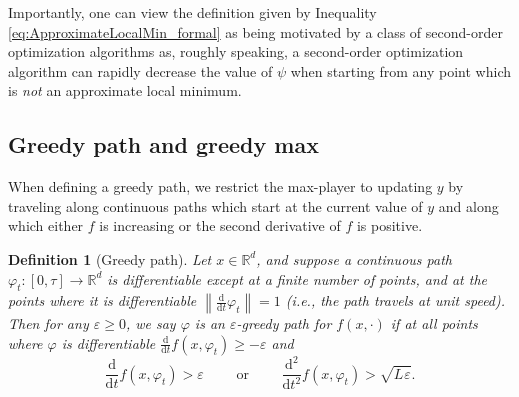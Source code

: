 \documentclass[11pt,letterpaper]{article}
\renewcommand{\epsilon}{\varepsilon}
\newtheorem{definition}[theorem]{Definition}
\begin{document}
Importantly, one can view the definition given by Inequality \eqref{eq:ApproximateLocalMin_formal} as being motivated by a class of second-order optimization algorithms as,
 roughly speaking, a second-order optimization algorithm can rapidly decrease the value of $\psi$ when starting from any point which is {\em not} an approximate local minimum. 





\subsection{Greedy path and greedy max}

%
When defining a greedy path, we restrict the max-player to updating $y$ by traveling along continuous paths which start at the current value of $y$ and along which either $f$ is increasing or the second derivative of $f$ is positive.  %

\begin{definition}[{Greedy path}] \label{def_greedy_path}
Let $x\in \mathbb{R}^d$, and suppose a continuous path $\varphi_t:[0,\tau] \rightarrow \mathbb{R}^d$ is differentiable except at a finite number of points, and at the points where it is differentiable $\left\|\frac{\mathrm{d}}{\mathrm{d} t} \varphi_t \right\| = 1$ (i.e., the path travels at unit speed).  Then for any $\epsilon \geq 0$, we say $\varphi$ is an $\epsilon$-greedy path for $f(x, \cdot)$ if at all points where $\varphi$ is differentiable $\frac{\mathrm{d}}{\mathrm{d}t} f(x, \varphi_t)\geq - \epsilon$ and
%
\begin{equation} \label{eq_greedy_path}
 \frac{\mathrm{d}}{\mathrm{d}t} f(x, \varphi_t) >\epsilon \qquad \textrm{ or } \qquad
%
 \frac{\mathrm{d}^2}{\mathrm{d}t^2} f(x, \varphi_t) > \sqrt{L_{} \epsilon}.
%
\end{equation}
\end{definition}
\end{document}
